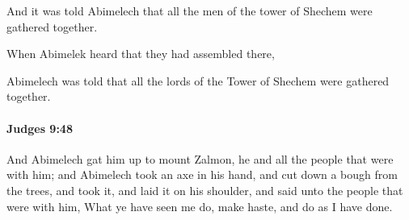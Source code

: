 			\begin{versebox}
					\item[BHS] 
					\item[ASV] And it was told Abimelech that all the men of the tower of Shechem were gathered together.
					\item[NIV] When Abimelek heard that they had assembled there,
					\item[NRSV] Abimelech was told that all the lords of the Tower of Shechem were gathered together.
			\end{versebox}

		\paragraph{Judges 9:48} %
			\label{JUDGES-9-48}

			And Abimelech gat him up to mount Zalmon, he and all the people that were with him; and Abimelech took an axe in his hand, and cut down a bough from the trees, and took it, and laid it on his shoulder, and said unto the people that were with him, What ye have seen me do, make haste, and do as I have done.

